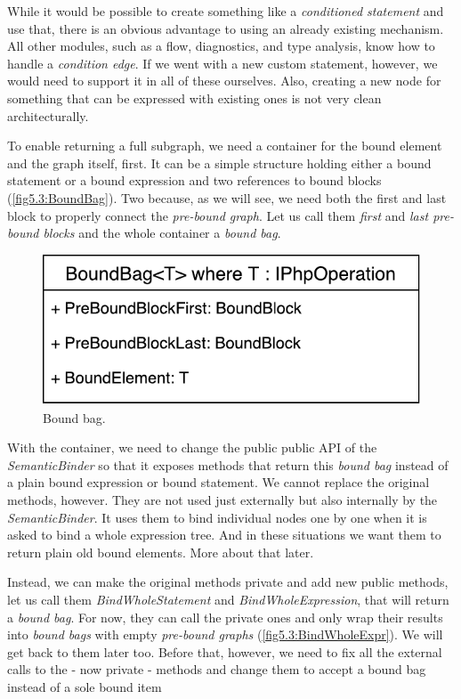 While it would be possible to create something like a \emph{conditioned statement} and use that, there is an obvious advantage to using an already existing mechanism. All other modules, such as a flow, diagnostics, and type analysis, know how to handle a \emph{condition edge}. If we went with a new custom statement, however, we would need to support it in all of these ourselves. Also, creating a new node for something that can be expressed with existing ones is not very clean architecturally.

To enable returning a full subgraph, we need a container for the bound element and the graph itself, first. It can be a simple structure holding either a bound statement or a bound expression and two references to bound blocks (\autoref{fig5.3:BoundBag}). Two because, as we will see, we need both the first and last block to properly connect the \emph{pre-bound graph}. Let us call them \emph{first} and \emph{last pre-bound blocks} and the whole container a \emph{bound bag}.

\begin{figure}[h]
	\centering	
	\includegraphics[scale=0.75]{../img/5_3_BoundBag}	
	\caption{Bound bag.}
	\label{fig5.3:BoundBag}
\end{figure}

With the container, we need to change the public public API of the \emph{SemanticBinder} so that it exposes methods that return this \emph{bound bag} instead of a plain bound expression or bound statement. We cannot replace the original methods, however. They are not used just externally but also internally by the \emph{SemanticBinder}. It uses them to bind individual nodes one by one when it is asked to bind a whole expression tree. And in these situations we want them to return plain old bound elements. More about that later.

Instead, we can make the original methods private and add new public methods, let us call them \emph{BindWholeStatement} and \emph{BindWholeExpression}, that will return a \emph{bound bag}. For now, they can call the private ones and only wrap their results into \emph{bound bags} with empty \emph{pre-bound graphs} (\autoref{fig5.3:BindWholeExpr}). We will get back to them later too. Before that, however, we need to fix all the external calls to the - now private - methods and change them to accept a bound bag instead of a sole bound item

